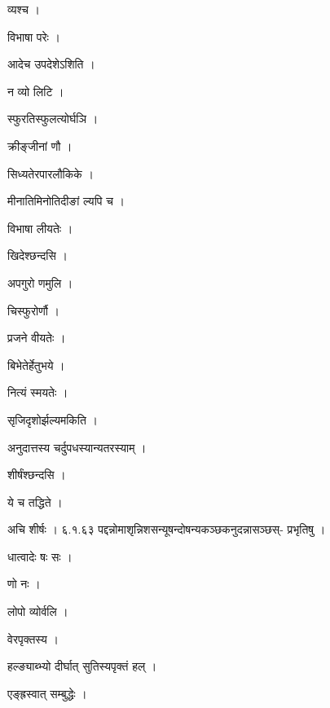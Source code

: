 \documentclass[10pt, openany]{book}
\begin{document}
\noindent व्यश्च ।

\noindent विभाषा परेः ।

\noindent आदेच उपदेशेऽशिति ।

\noindent न व्यो लिटि ।

\noindent स्फुरतिस्फुलत्योर्घञि ।

\noindent क्रीङ्जीनां णौ ।

\noindent सिध्यतेरपारलौकिके ।

\noindent मीनातिमिनोतिदीङां ल्यपि च ।

\noindent विभाषा लीयतेः ।

\noindent खिदेश्छन्दसि ।

\noindent अपगुरो णमुलि ।

\noindent चिस्फुरोर्णौ ।

\noindent प्रजने वीयतेः ।

\noindent बिभेतेर्हेतुभये ।

\noindent नित्यं स्मयतेः ।

\noindent सृजिदृशोर्झल्यमकिति ।

\noindent अनुदात्तस्य चर्दुपधस्यान्यतरस्याम् ।

\noindent शीर्षंश्छन्दसि ।

\noindent ये च तद्धिते ।

\noindent अचि शीर्षः । ६.१.६३ पद्दन्नोमाश‍ृन्निशसन्यूषन्दोषन्यकञ्छकनुदन्नासञ्छस्- प्रभृतिषु ।

\noindent धात्वादेः षः सः ।

\noindent णो नः ।

\noindent लोपो व्योर्वलि ।

\noindent वेरपृक्तस्य ।

\noindent हल्ङ्याब्भ्यो दीर्घात् सुतिस्यपृक्तं हल् ।

\noindent एङ्ह्रस्वात् सम्बुद्धेः ।
\end{document}
